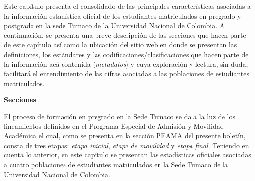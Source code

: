 \documentclass[
]{book}
\begin{document}
Este capítulo presenta el consolidado de las principales características asociadas a la información estadística oficial de los estudiantes matriculados en pregrado y postgrado en la sede Tumaco de la Universidad Nacional de Colombia. A continuación, se presenta una breve descripción de las secciones que hacen parte de este capítulo así como la ubicación del sitio web en donde se presentan las definiciones, los estándares y las codificaciones/clasificaciones que hacen parte de la información acá contenida (\emph{metadatos}) y cuya exploración y lectura, sin duda, facilitará el entendimiento de las cifras asociadas a las poblaciones de estudiantes matriculados.

\textbf{Secciones}

El proceso de formación en pregrado en la Sede Tumaco se da a la luz de los lineamientos definidos en el Programa Especial de Admisión y Movilidad Académica el cual, como se presenta en la sección \protect\hyperlink{peama}{PEAMA} del presente boletín, consta de tres etapas: \emph{etapa inicial}, \emph{etapa de movilidad} y \emph{etapa final}. Teniendo en cuenta lo anterior, en este capítulo se presentan las estadísticas oficiales asociadas a cuatro poblaciones de estudiantes matriculados en la Sede Tumaco de la Universidad Nacional de Colombia.
\end{document}
